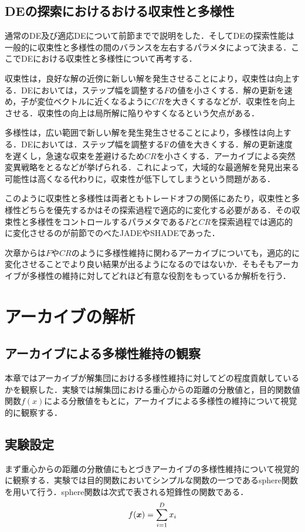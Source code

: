 \documentclass[a4paper,11pt,oneside,openany]{jsbook}
\def\vector#1{\mbox{\boldmath $#1$}}
\begin{document}
\section{DEの探索におけるおける収束性と多様性}
通常のDE及び適応DEについて前節までで説明をした．そしてDEの探索性能は一般的に収束性と多様性の間のバランスを左右するパラメタによって決まる．ここでDEにおける収束性と多様性について再考する．

収束性は，良好な解の近傍に新しい解を発生させることにより，収束性は向上する．DEにおいては，ステップ幅を調整する$F$の値を小さくする．解の更新を速め，子が変位ベクトルに近くなるように$CR$を大きくするなどが．収束性を向上させる．収束性の向上は局所解に陥りやすくなるという欠点がある．

多様性は，広い範囲で新しい解を発生発生させることにより，多様性は向上する．DEにおいては．ステップ幅を調整するFの値を大きくする．解の更新速度を遅くし，急速な収束を差避けるため$CR$を小さくする．アーカイブによる突然変異戦略をとるなどが挙げられる．これによって，大域的な最適解を発見出来る可能性は高くなる代わりに，収束性が低下してしまうという問題がある．

このように収束性と多様性は両者ともトレードオフの関係にあたり，収束性と多様性どちらを優先するかはその探索過程で適応的に変化する必要がある．その収束性と多様性をコントロールするパラメタである$F$と$CR$を探索過程では適応的に変化させるのが前節でのべたJADEやSHADEであった．

次章からは$F$や$CR$のように多様性維持に関わるアーカイブについても，適応的に変化させることでより良い結果が出るようになるのではないか．そもそもアーカイブが多様性の維持に対してどれほど有意な役割をもっているか解析を行う．


\chapter{アーカイブの解析}
\section{アーカイブによる多様性維持の観察}
本章ではアーカイブが解集団における多様性維持に対してどの程度貢献しているかを観察した．実験では解集団における重心からの距離の分散値と，目的関数値関数$f(x)$による分散値をもとに，アーカイブによる多様性の維持について視覚的に観察する．

\section{実験設定}
まず重心からの距離の分散値にもとづきアーカイブの多様性維持について視覚的に観察する．実験では目的関数においてシンプルな関数の一つであるsphere関数を用いて行う．sphere関数は次式で表される短鋒性の関数である．
\begin{eqnarray}
  f(\vector{x}) = \sum_{i=1}^D x_i
\end{eqnarray}
\end{document}
